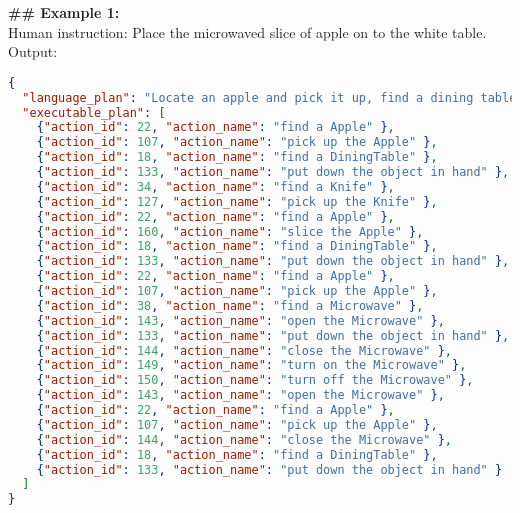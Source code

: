 \begin{tcolorbox}[colback=gray!5!white, colframe=gray!75!black, 
title=In-context example for EB-ALFRED long horizon tasks, boxrule=0.5mm, width=\textwidth, arc=3mm, auto outer arc=true]
\textbf{\#\# Example 1:}\\
Human instruction: Place the microwaved slice of apple on to the white table.\\
Output:
\begin{lstlisting}[language=json]
{
  "language_plan": "Locate an apple and pick it up, find a dining table and put the apple down, look for a knife and pick it up, find the apple and slice it. After slicing, I need to find a place like the dining table to put the knife down. After that, find an apple slice and pick it up, search for a microwave and open it, put the apple in the microwave and close it, turn on the microwave to heat the apple slice, turn off the microwave and open it, pick up the microwaved apple slice, close the microwave, find the white table, and place the microwaved apple slice on the white table.",
  "executable_plan": [
    {"action_id": 22, "action_name": "find a Apple" },
    {"action_id": 107, "action_name": "pick up the Apple" },
    {"action_id": 18, "action_name": "find a DiningTable" },
    {"action_id": 133, "action_name": "put down the object in hand" },
    {"action_id": 34, "action_name": "find a Knife" },
    {"action_id": 127, "action_name": "pick up the Knife" },
    {"action_id": 22, "action_name": "find a Apple" },
    {"action_id": 160, "action_name": "slice the Apple" },
    {"action_id": 18, "action_name": "find a DiningTable" },
    {"action_id": 133, "action_name": "put down the object in hand" },
    {"action_id": 22, "action_name": "find a Apple" },
    {"action_id": 107, "action_name": "pick up the Apple" },
    {"action_id": 38, "action_name": "find a Microwave" },
    {"action_id": 143, "action_name": "open the Microwave" },
    {"action_id": 133, "action_name": "put down the object in hand" },
    {"action_id": 144, "action_name": "close the Microwave" },
    {"action_id": 149, "action_name": "turn on the Microwave" },
    {"action_id": 150, "action_name": "turn off the Microwave" },
    {"action_id": 143, "action_name": "open the Microwave" },
    {"action_id": 22, "action_name": "find a Apple" },
    {"action_id": 107, "action_name": "pick up the Apple" },
    {"action_id": 144, "action_name": "close the Microwave" },
    {"action_id": 18, "action_name": "find a DiningTable" },
    {"action_id": 133, "action_name": "put down the object in hand" }
  ]
}
\end{lstlisting}
\end{tcolorbox}

